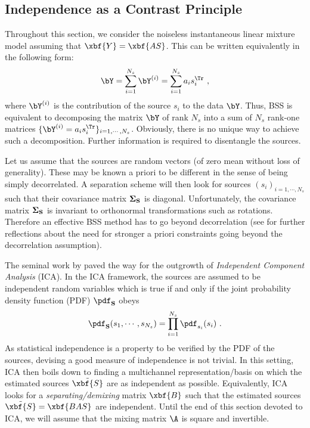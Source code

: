 \subsection{Independence as a Contrast Principle}
Throughout this section, we consider the noiseless instantaneous linear mixture model assuming that $\xbf{Y} = \xbf{AS}$. This can be written equivalently in the following form:
\begin{equation}
\label{eq:bss}
{\bY} = \sum_{i=1}^{N_s}   {\bY}^{(i)}  = \sum_{i=1}^{N_s}  a_i s_i^\Tr ~ ,
\end{equation}
where ${\bY}^{(i)}$ is the contribution of the source $s_i$ to the data $\bY$. Thus, BSS is equivalent to decomposing the matrix $\bY$ of rank $N_s$ into a sum of $N_s$ rank-one matrices $\{{\bY}^{(i)} = a_i s_i^\Tr\}_{i=1,\cdots,N_s}$. Obviously, there is no unique way to achieve such a decomposition. Further information is required to disentangle the sources.

Let us assume that the sources are random vectors (of zero mean without loss of generality). These may be known a priori to be different in the sense of being simply decorrelated. A separation scheme will then look for sources $(s_i)_{i=1,\cdots,N_s}$ such that their covariance matrix ${\boldsymbol \Sigma_{\bf S}}$ is diagonal. Unfortunately, the covariance matrix ${\boldsymbol \Sigma_{\bf S}}$ is invariant to orthonormal transformations such as rotations. Therefore an effective BSS method has to go beyond decorrelation (see \citet{ica:jade} for further reflections about the need for stronger a priori constraints going beyond the decorrelation assumption).
 
The seminal work by \citet{ica:comon94} paved the way for the outgrowth of \textit{Independent Component Analysis} (ICA). 
In the ICA framework, the sources are assumed to be independent random variables which is true if and only if the joint probability density function (PDF) $\pdf_{\bf S}$ obeys
\begin{equation}
\label{eq:bss_indep}
\pdf_{\bf S}(s_1,\cdots,s_{N_s}) = \prod_{i=1}^{N_s}   \pdf_{s_i}(s_i) ~ .
\end{equation}
As statistical independence is a property to be verified by the PDF of the sources, devising a good measure of independence is not trivial. In this setting, ICA then boils down to finding a multichannel representation/basis on which the estimated sources $\tilde{\xbf{S}}$ are as independent as possible. Equivalently, ICA looks for a \textit{separating/demixing} matrix $\xbf{B}$ such that the estimated sources $\tilde{\xbf{S}} = \xbf{BAS}$ are independent. Until the end of this section devoted to ICA, we will assume that the mixing matrix $\A$ is square and invertible.

